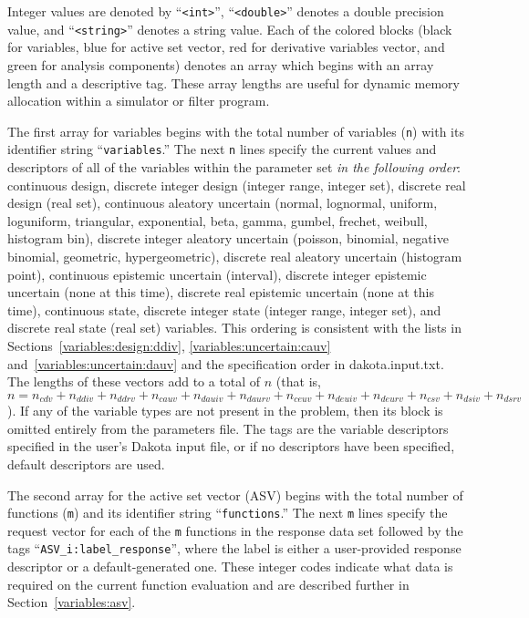 Integer values are denoted by ``\texttt{<int>}'',
``\texttt{<double>}'' denotes a double precision value, and
``\texttt{<string>}'' denotes a string value. Each of the colored
blocks (black for variables, blue for active set vector, red for
derivative variables vector, and green for analysis components)
denotes an array which begins with an array length and a descriptive
tag.  These array lengths are useful for dynamic memory allocation
within a simulator or filter program.

The first array for variables begins with the total number of
variables (\texttt{n}) with its identifier string
``\texttt{variables}.''  The next \texttt{n} lines specify the current
values and descriptors of all of the variables within the parameter
set \emph{in the following order}: continuous design, discrete integer
design (integer range, integer set), discrete real design (real set),
continuous aleatory uncertain (normal, lognormal, uniform, loguniform,
triangular, exponential, beta, gamma, gumbel, frechet, weibull,
histogram bin), discrete integer aleatory uncertain (poisson,
binomial, negative binomial, geometric, hypergeometric), discrete real
aleatory uncertain (histogram point), continuous epistemic uncertain
(interval), discrete integer epistemic uncertain (none at this time),
discrete real epistemic uncertain (none at this time), continuous
state, discrete integer state (integer range, integer set), and
discrete real state (real set) variables. This ordering is consistent
with the lists in
Sections~\ref{variables:design:ddiv}, \ref{variables:uncertain:cauv}
and~\ref{variables:uncertain:dauv}
and the specification order in dakota.input.txt.  The lengths of these
vectors add to a total of $n$ (that is, $n = n_{cdv} + n_{ddiv} +
n_{ddrv} + n_{cauv} + n_{dauiv} + n_{daurv} + n_{ceuv} + n_{deuiv} +
n_{deurv} + n_{csv} + n_{dsiv} + n_{dsrv}$).  If any of the variable
types are not present in the problem, then its block is omitted
entirely from the parameters file.  The tags are the variable
descriptors specified in the user's Dakota input file, or if no
descriptors have been specified, default descriptors are used.

The second array for the active set vector (ASV) begins with the total
number of functions (\texttt{m}) and its identifier string
``\texttt{functions}.'' The next \texttt{m} lines specify the request
vector for each of the \texttt{m} functions in the response data set
followed by the tags ``\texttt{ASV\_i:label\_response}'', where the
label is either a user-provided response descriptor or a
default-generated one. These integer codes indicate what data is
required on the current function evaluation and are described further
in Section~\ref{variables:asv}.

